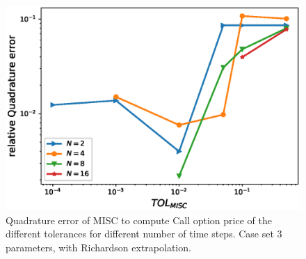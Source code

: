 \documentclass[11pt]{article}
\begin{document}
\begin{figure}[h!]
	\centering
	\includegraphics[width=0.7\linewidth]{./figures/rBergomi_MISC_quadratre_error/vs_TOL/set3/relative_quad_error_wrt_MISC_TOL_set3_with_rich}
	
	
	\caption{Quadrature error of MISC to compute Call option price of the different tolerances for different number of time steps. Case  set $3$ parameters, with Richardson extrapolation.}
	\label{fig:Quadrature_error_set3_rich}
\end{figure}
\end{document}
